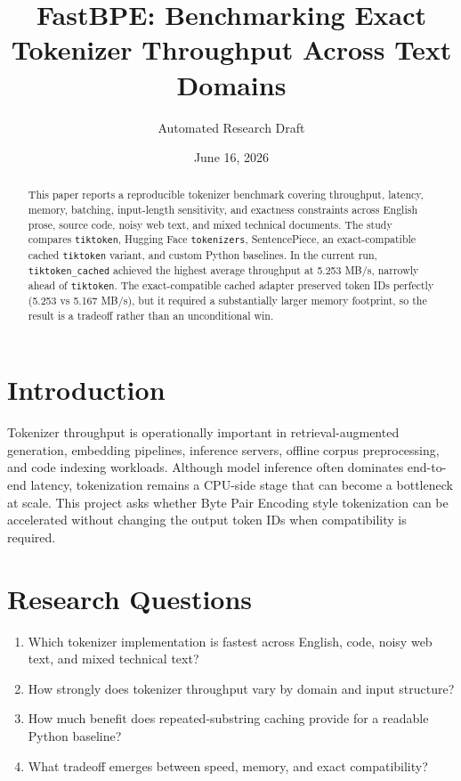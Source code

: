 \documentclass[11pt]{article}
\title{FastBPE: Benchmarking Exact Tokenizer Throughput Across Text Domains}
\author{Automated Research Draft}
\date{June 16, 2026}
\begin{document}
\maketitle

\begin{abstract}
This paper reports a reproducible tokenizer benchmark covering throughput, latency, memory, batching, input-length sensitivity, and exactness constraints across English prose, source code, noisy web text, and mixed technical documents. The study compares \texttt{tiktoken}, Hugging Face \texttt{tokenizers}, SentencePiece, an exact-compatible cached \texttt{tiktoken} variant, and custom Python baselines. In the current run, \texttt{tiktoken\_cached} achieved the highest average throughput at 5.253 MB/s, narrowly ahead of \texttt{tiktoken}. The exact-compatible cached adapter preserved token IDs perfectly (5.253 vs 5.167 MB/s), but it required a substantially larger memory footprint, so the result is a tradeoff rather than an unconditional win.
\end{abstract}

\section{Introduction}
Tokenizer throughput is operationally important in retrieval-augmented generation, embedding pipelines, inference servers, offline corpus preprocessing, and code indexing workloads. Although model inference often dominates end-to-end latency, tokenization remains a CPU-side stage that can become a bottleneck at scale. This project asks whether Byte Pair Encoding style tokenization can be accelerated without changing the output token IDs when compatibility is required.

\section{Research Questions}
\begin{enumerate}
\item Which tokenizer implementation is fastest across English, code, noisy web text, and mixed technical text?
\item How strongly does tokenizer throughput vary by domain and input structure?
\item How much benefit does repeated-substring caching provide for a readable Python baseline?
\item What tradeoff emerges between speed, memory, and exact compatibility?
\end{enumerate}
\end{document}
